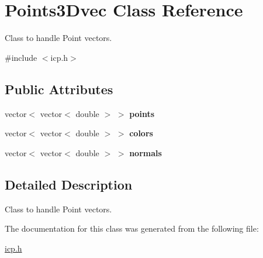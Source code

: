 \hypertarget{classPoints3Dvec}{}\section{Points3\+Dvec Class Reference}
\label{classPoints3Dvec}


Class to handle Point vectors.  




{\ttfamily \#include $<$icp.\+h$>$}

\subsection*{Public Attributes}
\begin{DoxyCompactItemize}
\item 
\mbox{\label{classPoints3Dvec_a659839ac91974126c56a70aa3b4fe731}} 
vector$<$ vector$<$ double $>$ $>$ {\bfseries points}
\item 
\mbox{\label{classPoints3Dvec_ac92388c47ebc7f0043cab6b389d9a8ce}} 
vector$<$ vector$<$ double $>$ $>$ {\bfseries colors}
\item 
\mbox{\label{classPoints3Dvec_a391c4f2145e07c11dbd6ac026ffc402c}} 
vector$<$ vector$<$ double $>$ $>$ {\bfseries normals}
\end{DoxyCompactItemize}


\subsection{Detailed Description}
Class to handle Point vectors. 

The documentation for this class was generated from the following file\+:\begin{DoxyCompactItemize}
\item 
\hyperlink{icp_8h}{icp.\+h}\end{DoxyCompactItemize}
